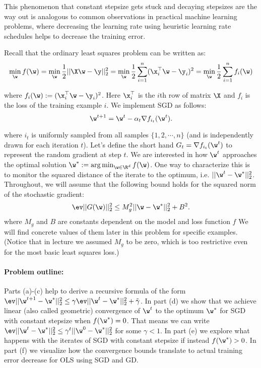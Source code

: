 \documentclass[preview]{standalone}
\begin{document}
This phenomenon that constant stepsize gets stuck and decaying stepsizes
are the way out is analogous to common observations in practical machine
learning problems, where decreasing the learning rate using
heuristic learning rate schedules helps to decrease the training error.

Recall that the ordinary least squares problem can be written as:
$$\min_{\w} f(\w) = \min_{\w} \frac{1}{2} || \X\w - \y||^2_2 = \min_{\w} \frac{1}{2} \sum_{i=1}^n (\x_i^\top \w - \y_i)^2 = \min_{\w} \frac{1}{2} \sum_{i=1}^n f_i(\w)$$

where $f_i(\w) := (\x_i^\top \w - \y_i)^2$. Here $\x_i^\top$ is the
$i$th row of matrix $\X$ and $f_i$ is the loss of the training
example $i$. We implement SGD as follows:
\begin{equation*}
\w^{t+1} = \w^{t} - \alpha_{t} \nabla f_{i_t}(\w^{t}).
\end{equation*}

where $i_t$ is uniformly sampled from all samples $\{ 1, 2, \cdots ,
n\}$ (and is independently drawn for each iteration $t$). Let's define
the short hand $G_{t} = \nabla f_{i_t}(\w^{t})$ to represent the
random gradient at step $t$. We are interested in how $\w^t$
approaches the optimal solution $\w^{*} := \arg \min_{\w\in \R^d}
f(\w)$. One way to characterize this is to monitor the squared
distance of the iterate to the optimum, i.e. $|| \w^t - \w^* || ^2_2$.
Throughout, we will assume that the following bound holds for the
squared norm of the stochastic gradient:
\begin{equation}
\label{eq:ass}
\ev ||G(\w)||_2^2 \leq M_g^2 ||\w-\w^*||_2^2 + B^2.
\end{equation}
where $M_g$ and $B$ are constants dependent on the model and loss function $f$
We will find concrete values of them later in this problem for specific examples. (Notice that in lecture we assumed $M_g$ to be zero, which is too restrictive even for the most basic least squares loss.)

\paragraph{Problem outline:} Parts (a)-(c) help to derive a recursive formula of the form $\ev
|| \w^{t+1} - \w^* || ^2_2 \leq \gamma \ev || \w^t - \w^* || ^2_2
+ \tilde{\gamma}$.
In part (d) we show that we achieve linear (also called geometric)
convergence of $\w^t$ to the optimum $\w^*$ for SGD with constant
stepsize when $f(\w^*) = 0$. That means we can write $\ev || \w^{t}
- \w^* || ^2_2 \leq \gamma^t || \w^{0} - \w^* || ^2_2$ for some
$\gamma <1 $.  In part (e) we explore what happens with the iterates
of SGD with constant stepsize if instead $f(\w^*) > 0$.  In part (f)
we visualize how the convergence bounds translate to actual training
error decrease for OLS using SGD and GD.
\end{document}
